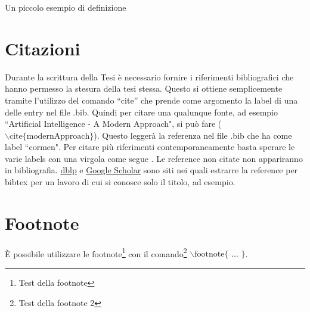 \begin{defn}
	Un piccolo esempio di definizione
\end{defn}

\begin{table}[ht]
	\centering

	\caption{Esempio di tabella}
	\label{tab:perf}
\end{table}


\section{Citazioni}
Durante la scrittura della Tesi è necessario fornire i riferimenti bibliografici che hanno permesso la stesura della tesi stessa.
Questo si ottiene semplicemente tramite l'utilizzo del comando ``cite'' che prende come argomento la label di una delle entry nel file .bib.
Quindi per citare una qualunque fonte, ad esempio ``Artificial Intelligence - A Modern Approach", si può fare \cite{modernApproach} ($\backslash\text{cite}\{\text{modernApproach}\}$).
Questo leggerà la referenza nel file .bib che ha come label ``cormen".
Per citare più riferimenti contemporaneamente basta sperare le varie labels con una virgola come segue \cite{gelfond1998action,modernApproach,durfee1999distributed,de2003resource,allen2009complexity,bernstein2002complexity}.
Le reference non citate non appariranno in bibliografia.
\href{https://dblp.uni-trier.de/}{dblp} e \href{https://scholar.google.com/}{Google Scholar} sono siti nei quali estrarre la reference per bibtex per un lavoro di cui si conosce solo il titolo, ad esempio.

\section{Footnote}
È possibile utilizzare le footnote\footnote{Test della footnote} con il comando\footnote{Test della footnote 2} $\backslash\text{footnote}\{\text{ ... }\}$.